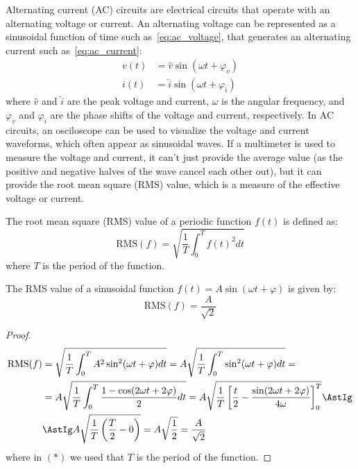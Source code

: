Alternating current (AC) circuits are electrical circuits that operate with an alternating voltage or current. An alternating voltage can be represented as a sinusoidal function of time such as~\ref{eq:ac_voltage}, that generates an alternating current such as~\ref{eq:ac_current}:
\begin{align}
v(t) &= \hat{v} \sin(\omega t + \varphi_v)
\label{eq:ac_voltage}
\\i(t) &= \hat{i} \sin(\omega t + \varphi_i)
\label{eq:ac_current}
\end{align}
where $\hat{v}$ and $\hat{i}$ are the peak voltage and current, $\omega$ is the angular frequency, and $\varphi_v$ and $\varphi_i$ are the phase shifts of the voltage and current, respectively. In AC circuits, an osciloscope can be used to visualize the voltage and current waveforms, which often appear as sinusoidal waves. If a multimeter is used to measure the voltage and current, it can't just provide the average value (as the positive and negative halves of the wave cancel each other out), but it can provide the root mean square (RMS) value, which is a measure of the effective voltage or current.
\begin{definicion}
The root mean square (RMS) value of a periodic function $f(t)$ is defined as:
\begin{equation*}
\text{RMS}(f) = \sqrt{\frac{1}{T} \int_0^T f(t)^2 dt}
\end{equation*}
where $T$ is the period of the function.
\end{definicion}
\begin{prop}
The RMS value of a sinusoidal function $f(t) = A \sin(\omega t + \varphi)$ is given by:
\begin{equation*}
\text{RMS}(f) = \frac{A}{\sqrt{2}}
\end{equation*}
\end{prop}
\begin{proof}
\begin{align*}
\text{RMS}(f) &= \sqrt{\frac{1}{T} \int_0^T A^2 \sin^2(\omega t + \varphi) dt}
= A \sqrt{\frac{1}{T} \int_0^T \sin^2(\omega t + \varphi) dt}
=\\&= A \sqrt{\frac{1}{T} \int_0^T \frac{1 - \cos(2\omega t + 2\varphi)}{2} dt}
= A \sqrt{\frac{1}{T} \left[ \frac{t}{2} - \frac{\sin(2\omega t + 2\varphi)}{4\omega} \right]_0^T}
\AstIg\\&\AstIg A \sqrt{\frac{1}{T} \left( \frac{T}{2} - 0 \right)}
= A \sqrt{\frac{1}{2}} = \frac{A}{\sqrt{2}}
\end{align*}
where in $(\ast)$ we used that $T$ is the period of the function.
\end{proof}

